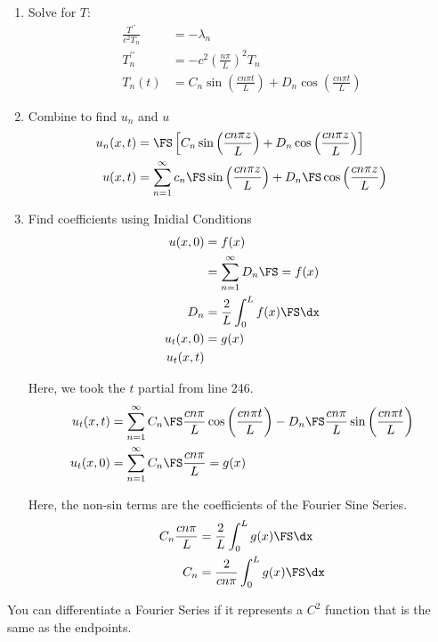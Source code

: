\begin{enumerate}
  \item Solve for $T$:
  \begin{align}
    \frac{T^{\prime\prime}}{c^2 T_n}
    & = - \lambda_n\\
    T^{\prime\prime}_n
    & = -c^2 \left( \frac{n \pi}{L} \right)^2 T_n\\
    T_n(t)
    & = C_n \sin \left( \frac{c n \pi t}{L} \right)
    + D_n \cos \left( \frac{c n \pi t}{L} \right)
  \end{align}

  \item Combine to find $u_n$ and $u$
  \begin{align}
    u_n(x, t)
    & = \FS \left[ C_n \sin\left(\frac{ c n \pi z}{L} \right)
    + D_n \cos \left( \frac{c n \pi z}{L} \right) \right]\\
    u(x, t)
    & = \sum^\infty_{n = 1} c_n \FS \sin \left( \frac{c n \pi z}{L}\right)
    + D_n \FS \cos \left( \frac{c n \pi z}{L} \right)
  \end{align}

  \item Find coefficients using Inidial Conditions
  \begin{align}
    u(x, 0) & = f(x)\\
    & = \sum^\infty_{n = 1} D_n \FS = f(x)\\
    D_n & = \frac{2}{L} \int^L_0 f(x) \FS \dx\\
    u_t(x, 0) & = g(x)\\
    u_t(x, t)
  \end{align}

  Here, we took the $t$ partial from line 246.
  \begin{align}
    u_t(x, t)
    & = \sum^\infty_{n = 1}
    C_n \FS \frac{c n \pi}{L} \cos \left(\frac{c n \pi t}{L}\right)
    - D_n \FS \frac{c n \pi}{L} \sin\left( \frac{c n \pi t}{L} \right)\\
    u_t(x, 0)
    & = \sum^\infty_{n = 1} C_n \FS \frac{c n \pi}{L} = g(x)
  \end{align}

  Here, the non-sin terms are the coefficients of the Fourier Sine Series.
  \begin{align}
    C_n \frac{c n \pi}{L} & = \frac{2}{L} \int^L_0 g(x) \FS \dx\\
    C_n & = \frac{2}{c n \pi} \int^L_0 g(x) \FS \dx
  \end{align}
\end{enumerate}

\thm You can differentiate a Fourier Series if it represents a $C^2$ function that is the same as the endpoints.

